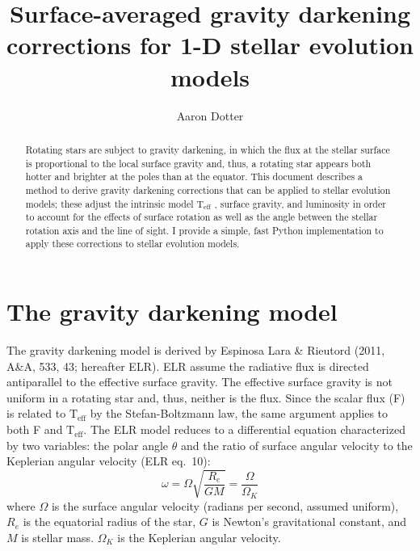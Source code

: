 \documentclass[12pt]{article}
\newcommand{\Teff}{\mathrm{T_{eff}}}
\begin{document}
\title{Surface-averaged gravity darkening corrections for 1-D stellar evolution models}
\author{Aaron Dotter}

\maketitle

\begin{abstract}
Rotating stars are subject to gravity darkening, in which the flux
at the stellar surface is proportional to the local surface gravity and,
thus, a rotating star appears both hotter and brighter at the poles than
at the equator. This document describes a method to derive gravity
darkening corrections that can be applied to stellar evolution models;
these adjust the intrinsic model $\Teff$ , surface gravity, and luminosity
in order to account for the effects of surface rotation as well as the
angle between the stellar rotation axis and the line of sight. I provide
a simple, fast Python implementation to apply these corrections to stellar
evolution models.
\end{abstract}


\section{The gravity darkening model}
The gravity darkening model is derived by Espinosa Lara \& Rieutord (2011,
A\&A, 533, 43; hereafter ELR). ELR assume the radiative flux is directed
antiparallel to the effective surface gravity. The effective surface gravity
is not uniform in a rotating star and, thus, neither is the flux. Since the
scalar flux (F) is related to $\Teff$ by the Stefan-Boltzmann law, the same
argument applies to both F and $\Teff$. The ELR model reduces to a differential
equation characterized by two variables: the polar angle $\theta$ and the ratio
of surface angular velocity to the Keplerian angular velocity (ELR eq.\ 10):
\begin{equation}
  \omega = \Omega \sqrt{ \frac{R_e}{GM} } = \frac{\Omega}{\Omega_K}
\end{equation}
where $\Omega$ is the surface angular velocity (radians per second,
assumed uniform), $R_e$ is the equatorial radius of the star, $G$ is Newton’s
gravitational constant, and $M$ is stellar mass. $\Omega_K$ is the Keplerian
angular velocity. %
\end{document}
